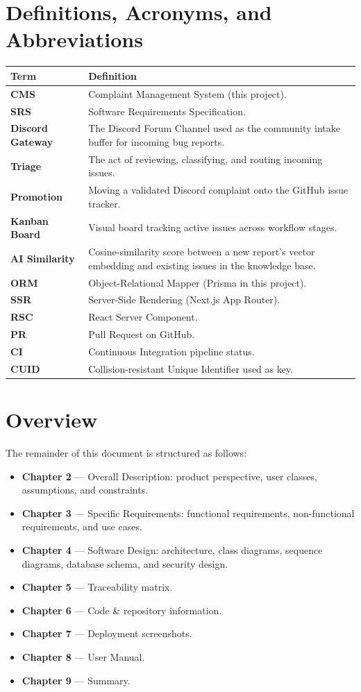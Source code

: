 \documentclass[12pt,a4paper]{report}
\begin{document}
\section{Definitions, Acronyms, and Abbreviations}

\begin{longtable}{>{\bfseries}p{3.5cm} p{10cm}}
\toprule
Term & Definition \\
\midrule
\endhead
CMS & Complaint Management System (this project). \\
SRS & Software Requirements Specification. \\
Discord Gateway & The Discord Forum Channel used as the community intake
                   buffer for incoming bug reports. \\
Triage & The act of reviewing, classifying, and routing incoming issues. \\
Promotion & Moving a validated Discord complaint onto the GitHub issue tracker. \\
Kanban Board & Visual board tracking active issues across workflow stages. \\
AI Similarity & Cosine-similarity score between a new report's vector embedding
                 and existing issues in the knowledge base. \\
ORM & Object-Relational Mapper (Prisma in this project). \\
SSR & Server-Side Rendering (Next.js App Router). \\
RSC & React Server Component. \\
PR & Pull Request on GitHub. \\
CI & Continuous Integration pipeline status. \\
CUID & Collision-resistant Unique Identifier used as  key. \\
\bottomrule
\end{longtable}

\section{Overview}
The remainder of this document is structured as follows:
\begin{itemize}
  \item \textbf{Chapter 2} --- Overall Description: product perspective, user
    classes, assumptions, and constraints.
  \item \textbf{Chapter 3} --- Specific Requirements: functional requirements,
    non-functional requirements, and use cases.
  \item \textbf{Chapter 4} --- Software Design: architecture, class diagrams,
    sequence diagrams, database schema, and security design.
  \item \textbf{Chapter 5} --- Traceability matrix.
  \item \textbf{Chapter 6} --- Code \& repository information.
  \item \textbf{Chapter 7} --- Deployment screenshots.
  \item \textbf{Chapter 8} --- User Manual.
  \item \textbf{Chapter 9} --- Summary.
\end{itemize}
\end{document}
